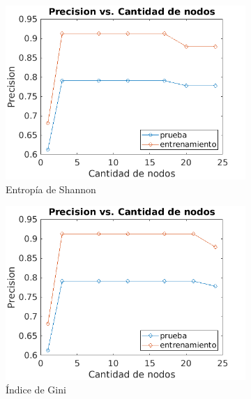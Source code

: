 \documentclass[a4paper]{article}
\begin{document}
\begin{figure}[h]
  \centering
  \begin{subfigure}{.4\textwidth}
    \centering
    \includegraphics[width=\linewidth]{img/prec-shannon.png}
    \caption{Entropía de Shannon}
    \label{titanic-nodecount:sfig1}
  \end{subfigure}%
  \begin{subfigure}{.4\textwidth}
    \centering
    \includegraphics[width=\linewidth]{img/prec-gini.png}
    \caption{Índice de Gini}
    \label{titanic-nodecount:sfig2}
  \end{subfigure}
  \begin{subfigure}{.4\textwidth}
    \centering

\end{subfigure}
\end{figure}
\end{document}
